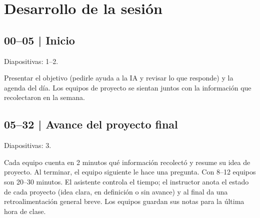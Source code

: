 \documentclass[11pt,a4paper]{article}
\newcommand{\diapos}[1]{\textcolor{gris}{\small\textsf{Diapositivas: #1}}\par}
\begin{document}
\section{Desarrollo de la sesión}
\subsection{00--05 | Inicio}
\diapos{1--2.}
Presentar el objetivo (pedirle ayuda a la IA y revisar lo que responde) y la agenda del día. Los equipos de proyecto se sientan juntos con la información que recolectaron en la semana.

\subsection{05--32 | Avance del proyecto final}
\diapos{3.}
Cada equipo cuenta en 2 minutos qué información recolectó y resume su idea de proyecto. Al terminar, el equipo siguiente le hace una pregunta. Con 8--12 equipos son 20--30 minutos. El asistente controla el tiempo; el instructor anota el estado de cada proyecto (idea clara, en definición o sin avance) y al final da una retroalimentación general breve. Los equipos guardan sus notas para la última hora de clase.
\end{document}
